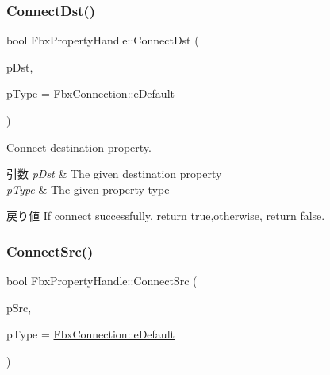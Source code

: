 \subsubsection{\texorpdfstring{Connect\+Dst()}{ConnectDst()}}
{\footnotesize\ttfamily bool Fbx\+Property\+Handle\+::\+Connect\+Dst (\begin{DoxyParamCaption}\item[{const \hyperlink{class_fbx_property_handle}{Fbx\+Property\+Handle} \&}]{p\+Dst,  }\item[{const \hyperlink{class_fbx_connection_a3df448a5db356652ab99fd2be2553749}{Fbx\+Connection\+::\+E\+Type}}]{p\+Type = {\ttfamily \hyperlink{class_fbx_connection_a3df448a5db356652ab99fd2be2553749a93ca385d7cc25fef28232a2d10b836e3}{Fbx\+Connection\+::e\+Default}} }\end{DoxyParamCaption})}

Connect destination property. 
\begin{DoxyParams}{引数}
{\em p\+Dst} & The given destination property \\
\hline
{\em p\+Type} & The given property type \\
\hline
\end{DoxyParams}
\begin{DoxyReturn}{戻り値}
If connect successfully, return true,otherwise, return false. 
\end{DoxyReturn}
\mbox{\label{class_fbx_property_handle_a9682cef8ffadfe43c594a9cf787879b1}} 
\subsubsection{\texorpdfstring{Connect\+Src()}{ConnectSrc()}}
{\footnotesize\ttfamily bool Fbx\+Property\+Handle\+::\+Connect\+Src (\begin{DoxyParamCaption}\item[{const \hyperlink{class_fbx_property_handle}{Fbx\+Property\+Handle} \&}]{p\+Src,  }\item[{const \hyperlink{class_fbx_connection_a3df448a5db356652ab99fd2be2553749}{Fbx\+Connection\+::\+E\+Type}}]{p\+Type = {\ttfamily \hyperlink{class_fbx_connection_a3df448a5db356652ab99fd2be2553749a93ca385d7cc25fef28232a2d10b836e3}{Fbx\+Connection\+::e\+Default}} }\end{DoxyParamCaption})}

